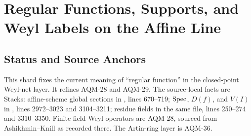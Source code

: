 
\section{Regular Functions, Supports, and Weyl Labels on the Affine Line}
\label{sec:regular-functions-affine-line-weyl-labels}

\subsection{Status and Source Anchors}
This shard fixes the current meaning of ``regular function'' in the
closed-point Weyl-net layer.  It refines AQM-28 and AQM-29.  The source-local
facts are Stacks: affine-scheme global sections in
, lines
670--719; \(\operatorname{Spec}\), \(D(f)\), and \(V(I)\) in
, lines
2972--3023 and 3104--3211; residue fields in the same file, lines 250--274
and 3310--3350.  Finite-field Weyl operators are AQM-28, sourced from
Ashikhmin--Knill as recorded there.  The Artin-ring layer is AQM-36.


